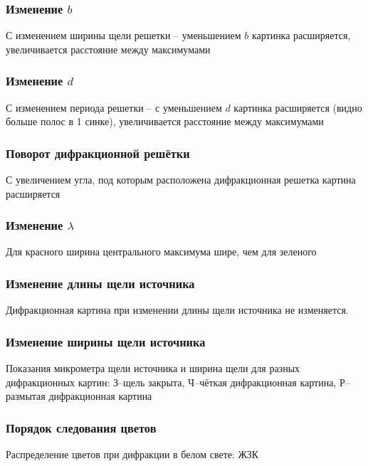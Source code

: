 \subsubsection{Изменение $b$}
С изменением ширины щели решетки -- уменьшением $b$ картинка расширяется, увеличивается расстояние между максимумами

\subsubsection{Изменение $d$}
С изменением периода решетки -- с уменьшением $d$ картинка расширяется (видно больше полос в 1 синке), увеличивается расстояние между максимумами

\subsubsection{Поворот дифракционной решётки}
С увеличением угла, под которым расположена дифракционная решетка картина расширяется


\subsubsection{Изменение $\lambda$}
Для красного ширина центрального максимума шире, чем для зеленого

\subsubsection{Изменение длины щели источника}
Дифракционная картина при изменении длины щели источника не изменяется. 

\subsubsection{Изменение ширины щели источника}

\begin{table}[H]
	    \caption{Показания микрометра щели источника и ширина щели для разных дифракционных картин: З--щель закрыта, Ч--чёткая дифракционная картина, Р--размытая дифракционная картина}
	    \label{tab:chem1}

	\mytable
	
\end{table}

\subsubsection{Порядок следования цветов}
Распределение цветов при дифракции в белом свете: ЖЗК













